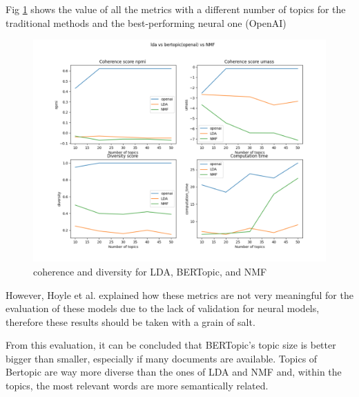 Fig \ref{figure:unsupervised_results} shows the value of all the metrics with a different number of topics for the traditional methods and the best-performing neural one (OpenAI)

\begin{figure}[h]
    \centering %
        \includegraphics[width=0.99\linewidth]{Chapter4/figures/topic_unsupervised.png} 
    \caption{coherence and diversity for LDA, BERTopic, and NMF
    }
    \label{figure:unsupervised_results} 
\end{figure}


However, Hoyle et al. \cite{hoyle_is_2021} explained how these metrics are not very meaningful for the evaluation of these models due to the lack of validation for neural models, therefore  these results should be taken with a grain of salt.

From this evaluation, it can be concluded that BERTopic’s topic size is better bigger than smaller, especially if many documents are available. Topics of Bertopic are way more diverse than the ones of LDA and NMF and, within the topics, the most relevant words are more semantically related.


